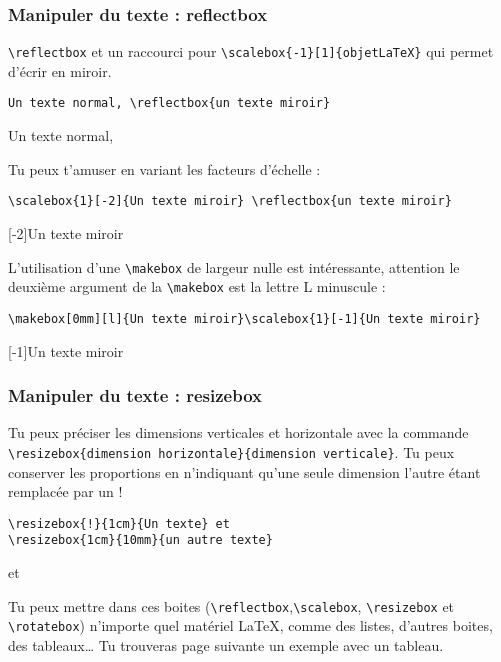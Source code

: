 \documentclass[10pt,hyperref={pdfpagemode=FullScreen},xcolor=dvipsnames,xcolor=table, xcolor=svgnames]{beamer}%
\newcommand{\latex}{\LaTeX\xspace}
\begin{document}
 \begin{frame}[fragile]
   \frametitle{Manipuler du texte : reflectbox}
{\color{blue}\verb!\reflectbox!} et un raccourci pour 
{\color{blue}\verb!\scalebox{-1}[1]{objetLaTeX}!} qui permet d'écrir en miroir.\par
\begin{exampleblock}{}
\begin{verbatim}
Un texte normal, \reflectbox{un texte miroir}
\end{verbatim}
\end{exampleblock}
\begin{block}{}
Un texte normal, 
\end{block}
Tu peux t'amuser en variant les facteurs d'échelle :
\begin{exampleblock}{}
\begin{verbatim}
\scalebox{1}[-2]{Un texte miroir} \reflectbox{un texte miroir}
\end{verbatim}
\end{exampleblock}
\begin{block}{}
\scalebox{1}[-2]{Un texte miroir} 
\end{block}
L'utilisation d'une {\color{blue}\verb!\makebox!} de largeur nulle est intéressante,  \alert{attention} le deuxième argument de la {\color{blue}\verb!\makebox!} est la lettre L minuscule :
\begin{exampleblock}{}\footnotesize
\begin{verbatim}
\makebox[0mm][l]{Un texte miroir}\scalebox{1}[-1]{Un texte miroir}
\end{verbatim}
\end{exampleblock}
\begin{block}{}
\scalebox{1}[-1]{Un texte miroir}
\end{block}
\end{frame}
 \begin{frame}[fragile]
   \frametitle{Manipuler du texte : resizebox}
Tu peux préciser les dimensions verticales et horizontale avec la commande {\color{blue}\verb!\resizebox{dimension horizontale}{dimension verticale}!}. Tu peux conserver les proportions en n'indiquant qu'une seule dimension l'autre étant remplacée par un \og ! \fg
\begin{exampleblock}{}
\begin{verbatim}
\resizebox{!}{1cm}{Un texte} et 
\resizebox{1cm}{10mm}{un autre texte}
\end{verbatim}
\end{exampleblock}
\begin{block}{}
 et 
\end{block}
Tu peux mettre dans ces boites ({\color{blue}\verb!\reflectbox!},{\color{blue}\verb!\scalebox!}, {\color{blue}\verb!\resizebox!} et {\color{blue}\verb!\rotatebox!}) n'importe quel matériel \latex, comme des listes, d'autres boites, des tableaux\dots
Tu trouveras page suivante un exemple avec un tableau.
\end{frame}
\end{document}
